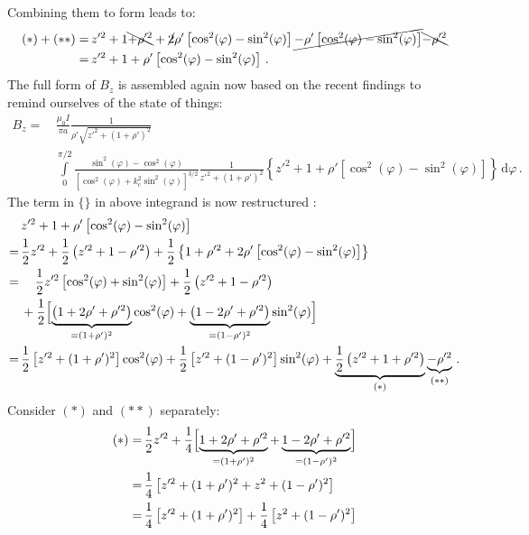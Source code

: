 Combining them to form  leads to:
\begin{align}
  (*) + (**)
 =&\, z'^2 + 1 \bcancel{+ \rho'^2} + \cancel{2} \rho' \left[ \cos^2(\varphi) - \sin^2(\varphi) \right] \cancel{- \rho' \left[ \cos^2(\varphi) - \sin^2(\varphi) \right]} \bcancel{- \rho'^2} \nonumber \\
 =&\, z'^2 + 1 + \rho' \left[ \cos^2(\varphi) - \sin^2(\varphi) \right] \, .
\end{align}
The full form of $B_z$ is assembled again now based on the recent findings to remind ourselves of the state of things:
\begin{align}
 B_z
 =&\, \frac{\mu_0 I}{\pi a}
      \frac{1}{\rho' \sqrt{z'^2 + (1 + \rho')^2}} \nonumber \\
 ~&\, \int\limits_0^{\pi/2}
        \frac{\sin^2(\varphi) - \cos^2(\varphi)}
             {\left[\cos^2(\varphi) + k_c^2 \sin^2(\varphi) \right]^{3/2}}
        \frac{1}{z'^2 + (1 + \rho')^2}
        \left\{ z'^2 + 1 + \rho' \left[ \cos^2(\varphi) - \sin^2(\varphi) \right] \right\} \,\mathrm{d}\varphi \, . \label{eqn:B_z_core}
\end{align}
The term in $\{\}$ in above integrand is now restructured :
\begin{align}
 ~&\, z'^2 + 1 + \rho' \left[ \cos^2(\varphi) - \sin^2(\varphi) \right] \nonumber \\
 =&\, \frac{1}{2} z'^2 + \frac{1}{2} \left( z'^2 + 1 - \rho'^2 \right) + \frac{1}{2} \left\{ 1 + \rho'^2 + 2 \rho' \left[ \cos^2(\varphi) - \sin^2(\varphi) \right] \right\} \nonumber \\
 =&\, \phantom{+}~
        \frac{1}{2} z'^2 \left[ \cos^2(\varphi) + \sin^2(\varphi) \right]
      + \frac{1}{2} \left( z'^2 + 1 - \rho'^2 \right) \nonumber \\
 ~&\, + \frac{1}{2} \Bigl[   \underbrace{\left( 1 + 2 \rho' + \rho'^2 \right)}_{=(1+\rho')^2} \cos^2(\varphi)
                           + \underbrace{\left( 1 - 2 \rho' + \rho'^2 \right)}_{=(1-\rho')^2} \sin^2(\varphi) \Bigr] \nonumber \\
 =&\,   \frac{1}{2} \left[ z'^2 + (1 + \rho')^2 \right] \cos^2(\varphi) + \frac{1}{2} \left[ z'^2 + (1 - \rho')^2 \right] \sin^2(\varphi)
      + \underbrace{\frac{1}{2} \left( z'^2 + 1 + \rho'^2 \right)}_{(*)} \underbrace{- \rho'^2}_{(**)} \label{eqn:bZCore} \, .
\end{align}
Consider $(*)$ and $(**)$ separately:
\begin{align}
 (*)
 =&\, \frac{1}{2} z'^2 + \frac{1}{4} \Bigl[ \underbrace{1 + 2 \rho' + \rho'^2}_{=(1+\rho')^2} + \underbrace{1 - 2 \rho' + \rho'^2}_{=(1-\rho')^2} \Bigr] \nonumber \\
 =&\, \frac{1}{4} \left[ z'^2 + (1 + \rho')^2 + z^2 + (1 - \rho')^2 \right] \nonumber \\
 =&\, \frac{1}{4} \left[ z'^2 + (1 + \rho')^2 \right] + \frac{1}{4} \left[ z^2 + (1 - \rho')^2 \right]
\end{align}
